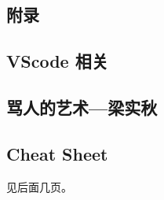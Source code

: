 \documentclass[a4paper, twoside]{article}
\begin{document}
\begin{multicols}{2}




		\section{附录}
			
			\subsection{VScode 相关}
				
			
			\newpage
			\subsection{骂人的艺术—梁实秋}
				

	\end{multicols}
	
	\vspace{2em}
	\subsection{Cheat Sheet}
		见后面几页。

	

	

	

	\pagestyle{empty}


	\newpage

	\null


\end{document}
